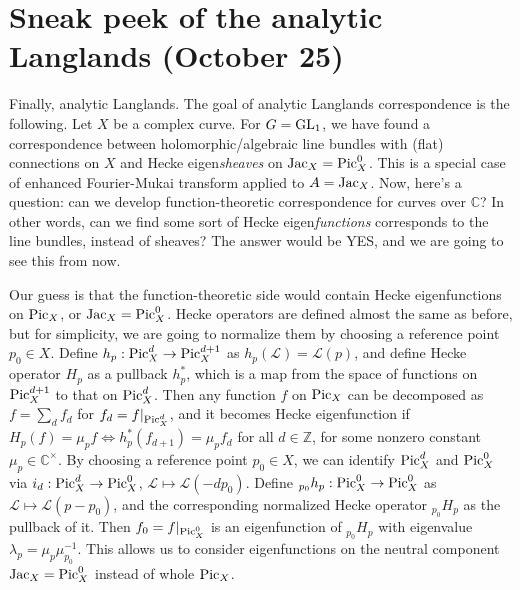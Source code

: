 \newpage
\section{Sneak peek of the analytic Langlands (October 25)}

Finally, analytic Langlands.
The goal of analytic Langlands correspondence is the following.
Let $X$ be a complex curve.
For $G = \operatorname{\mathrm{GL}}_1$, we have found a correspondence between holomorphic/algebraic line bundles with (flat) connections
on $X$ and Hecke eigen\emph{sheaves} on $\operatorname{\mathrm{Jac}}_X = \operatorname{\mathrm{Pic}}_X^{0}$.
This is a special case of enhanced Fourier-Mukai transform applied to $A = \operatorname{\mathrm{Jac}}_X$.
Now, here's a question: can we develop function-theoretic correspondence for curves over $\mathbb{C}$?
In other words, can we find some sort of Hecke eigen\emph{functions} corresponds 
to the line bundles, instead of sheaves?
The answer would be YES, and we are going to see this from now.

Our guess is that the function-theoretic side would contain
Hecke eigenfunctions on $\operatorname{\mathrm{Pic}}_X$, or $\operatorname{\mathrm{Jac}}_X = \operatorname{\mathrm{Pic}}_X^0$.
Hecke operators are defined almost the same as before, but for simplicity, we are going to 
normalize them by choosing a reference point $p_0 \in X$.
Define $h_p : \operatorname{\mathrm{Pic}}^{d}_X \to \operatorname{\mathrm{Pic}}^{d+1}_X$ as $h_p(\mathcal{L}) = \mathcal{L}(p)$,
and define Hecke operator $H_p$ as a pullback $h_p^*$, which is a map from the space of 
functions on $\operatorname{\mathrm{Pic}}^{d+1}_X$ to that on $\operatorname{\mathrm{Pic}}^{d}_X$.
Then any function $f$ on $\operatorname{\mathrm{Pic}}_X$ can be decomposed as $f = \sum_d f_d$ for $f_d = f|_{\operatorname{\mathrm{Pic}}^{d}_X}$, 
and it becomes Hecke eigenfunction if $H_p(f) = \mu_p f \Leftrightarrow h_{p}^{*}(f_{d+1}) = \mu_p f_{d}$
for all $d \in \mathbb{Z}$, for some nonzero constant $\mu_p \in \mathbb{C}^{\times}$.
By choosing a reference point $p_0 \in X$, we can identify $\operatorname{\mathrm{Pic}}^d_X$ and $\operatorname{\mathrm{Pic}}^0_X$ via 
$i_d: \operatorname{\mathrm{Pic}}_X^d \to \operatorname{\mathrm{Pic}}^0_X$, $\mathcal{L} \mapsto \mathcal{L}(-dp_0)$.
Define ${}_{p_0}h_{p}: \operatorname{\mathrm{Pic}}_X^0 \to \operatorname{\mathrm{Pic}}_X^0$ as $\mathcal{L} \mapsto \mathcal{L}(p - p_0)$, 
and the corresponding normalized Hecke operator ${}_{p_{0}}H_p$ as the pullback of it.
Then $f_0 = f|_{\operatorname{\mathrm{Pic}}^0_X}$ is an eigenfunction of ${}_{p_0}H_p$ with eigenvalue $\lambda_p = \mu_p\mu_{p_0}^{-1}$.
This allows us to consider eigenfunctions on the neutral component $\operatorname{\mathrm{Jac}}_X = \operatorname{\mathrm{Pic}}_X^0$ instead of whole $\operatorname{\mathrm{Pic}}_X$.

